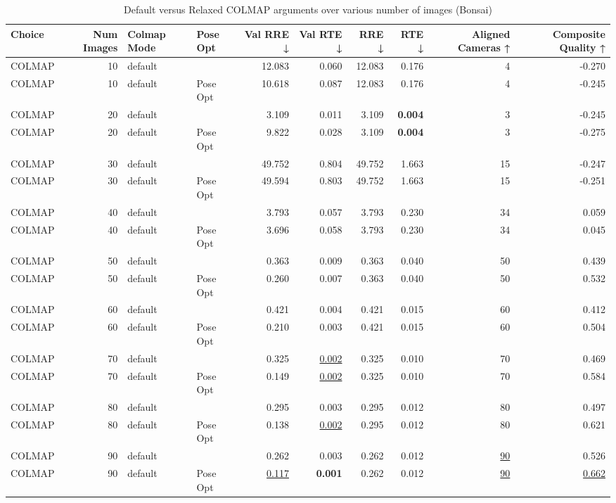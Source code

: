 \begin{table}[H]
\caption{Default versus Relaxed COLMAP arguments over various number of images (Bonsai)}
\label{tab:08_colmap_mode_bonsai}
\begin{tabular}{lrllrrrrrr}
\toprule
Choice & Num Images & Colmap Mode & Pose Opt & Val RRE ↓ & Val RTE ↓ & RRE ↓ & RTE ↓ & Aligned Cameras ↑ & Composite Quality ↑ \\
\midrule
COLMAP & 10 & default &  & 12.083 & 0.060 & 12.083 & 0.176 & 4 & -0.270 \\
COLMAP & 10 & default & Pose Opt & 10.618 & 0.087 & 12.083 & 0.176 & 4 & -0.245 \\
COLMAP & 20 & default &  & 3.109 & 0.011 & 3.109 & \textbf{0.004} & 3 & -0.245 \\
COLMAP & 20 & default & Pose Opt & 9.822 & 0.028 & 3.109 & \textbf{0.004} & 3 & -0.275 \\
COLMAP & 30 & default &  & 49.752 & 0.804 & 49.752 & 1.663 & 15 & -0.247 \\
COLMAP & 30 & default & Pose Opt & 49.594 & 0.803 & 49.752 & 1.663 & 15 & -0.251 \\
COLMAP & 40 & default &  & 3.793 & 0.057 & 3.793 & 0.230 & 34 & 0.059 \\
COLMAP & 40 & default & Pose Opt & 3.696 & 0.058 & 3.793 & 0.230 & 34 & 0.045 \\
COLMAP & 50 & default &  & 0.363 & 0.009 & 0.363 & 0.040 & 50 & 0.439 \\
COLMAP & 50 & default & Pose Opt & 0.260 & 0.007 & 0.363 & 0.040 & 50 & 0.532 \\
COLMAP & 60 & default &  & 0.421 & 0.004 & 0.421 & 0.015 & 60 & 0.412 \\
COLMAP & 60 & default & Pose Opt & 0.210 & 0.003 & 0.421 & 0.015 & 60 & 0.504 \\
COLMAP & 70 & default &  & 0.325 & \underline{0.002} & 0.325 & 0.010 & 70 & 0.469 \\
COLMAP & 70 & default & Pose Opt & 0.149 & \underline{0.002} & 0.325 & 0.010 & 70 & 0.584 \\
COLMAP & 80 & default &  & 0.295 & 0.003 & 0.295 & 0.012 & 80 & 0.497 \\
COLMAP & 80 & default & Pose Opt & 0.138 & \underline{0.002} & 0.295 & 0.012 & 80 & 0.621 \\
COLMAP & 90 & default &  & 0.262 & 0.003 & 0.262 & 0.012 & \underline{90} & 0.526 \\
COLMAP & 90 & default & Pose Opt & \underline{0.117} & \textbf{0.001} & 0.262 & 0.012 & \underline{90} & \underline{0.662} \\

\end{tabular}
\end{table}
